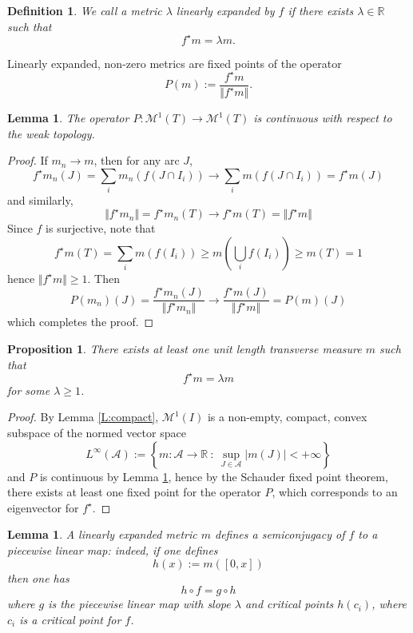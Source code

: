 \documentclass[11pt]{amsart}
\newtheorem{lemma}[theorem]{Lemma}
\newtheorem{proposition}[theorem]{Proposition}
\newtheorem{definition}[theorem]{Definition}
\begin{document}
\begin{definition}
We call a metric $\lambda$ \emph{linearly expanded} by $f$ if there exists $\lambda \in \mathbb{R}$ such that 
$$f^\star m = \lambda m.$$
\end{definition}

\noindent Linearly expanded, non-zero metrics are fixed points of the operator
$$P(m) := \frac{f^\star m}{\Vert f^\star m \Vert}.$$


\begin{lemma} \label{L:continuous}
The operator $P : \mathcal{M}^1(T) \to \mathcal{M}^1(T)$ is continuous with respect to the weak topology.
\end{lemma}

\begin{proof}
If $m_n \to m$, then for any arc $J$, 
$$f^\star m_n(J) = \sum_i m_n (f(J \cap I_i)) \to \sum_i m(f(J \cap I_i)) = f^\star m(J)$$
and similarly, 
$$\Vert f^\star m_n \Vert = f^\star m_n(T) \to  f^\star m(T) = \Vert f^\star m \Vert  $$
Since $f$ is surjective, note that 
$$f^\star m(T) = \sum_i m(f(I_i)) \geq m(\bigcup_i f(I_i)) \geq m(T) = 1$$
hence $\Vert f^\star m \Vert \geq 1$.
Then 
$$P(m_n)(J) = \frac{f^\star m_n(J)}{\Vert f^\star m_n \Vert} \to \frac{f^\star m(J)}{\Vert f^\star m \Vert} = P(m)(J)$$
which completes the proof.
\end{proof}

\begin{proposition}
There exists at least one unit length transverse measure $m$ such that 
$$f^\star m  = \lambda m$$
for some $\lambda \geq 1$.
\end{proposition}

\begin{proof}
By Lemma \ref{L:compact}, 
$\mathcal{M}^1(I)$ is a non-empty, compact, convex subspace of the normed vector space 
$$L^\infty(\mathcal{A}) := \left\{  m : \mathcal{A} \to \mathbb{R} \ : \ \sup_{J \in \mathcal{A}} |m(J)| < + \infty \right\}$$
and $P$ is continuous by Lemma \ref{L:continuous}, hence by the Schauder fixed point theorem, there exists at least one fixed point for the operator $P$, which corresponds to an eigenvector for $f^\star$. 
\end{proof}



\begin{lemma}
A linearly expanded metric $m$ defines a semiconjugacy of $f$ to a piecewise linear map: indeed, if one defines 
$$h(x) := m([0, x])$$
then one has 
$$h \circ f = g \circ h$$
where $g$ is the piecewise linear map with slope $\lambda$ and 
critical points $h(c_i)$, where $c_i$ is a critical point for $f$.
\end{lemma}
\end{document}
